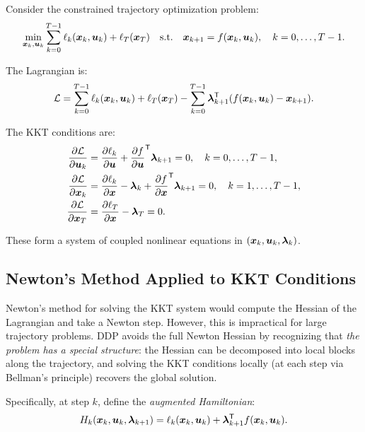 Consider the constrained trajectory optimization problem:
\begin{equation}
\min_{\bm{x}_k, \bm{u}_k} \sum_{k=0}^{T-1} \ell_k(\bm{x}_k,\bm{u}_k) + \ell_T(\bm{x}_T)
\quad \text{s.t.} \quad \bm{x}_{k+1} = f(\bm{x}_k,\bm{u}_k), \quad k = 0, \ldots, T-1.
\label{eq:ch5:traj-opt-full}
\end{equation}

The Lagrangian is:
\begin{equation}
\mathcal{L} = \sum_{k=0}^{T-1} \ell_k(\bm{x}_k,\bm{u}_k) + \ell_T(\bm{x}_T) - \sum_{k=0}^{T-1} \bm{\lambda}_{k+1}^{\mathsf{T}}(f(\bm{x}_k,\bm{u}_k) - \bm{x}_{k+1}).
\label{eq:ch5:lagrangian}
\end{equation}

The KKT conditions are:
\begin{align}
\frac{\partial \mathcal{L}}{\partial \bm{u}_k} &= \frac{\partial \ell_k}{\partial \bm{u}} + \frac{\partial f}{\partial \bm{u}}^{\mathsf{T}}\bm{\lambda}_{k+1} = 0, \quad k = 0, \ldots, T-1, \label{eq:ch5:kkt-u}\\
\frac{\partial \mathcal{L}}{\partial \bm{x}_k} &= \frac{\partial \ell_k}{\partial \bm{x}} - \bm{\lambda}_k + \frac{\partial f}{\partial \bm{x}}^{\mathsf{T}}\bm{\lambda}_{k+1} = 0, \quad k = 1, \ldots, T-1, \label{eq:ch5:kkt-x-mid}\\
\frac{\partial \mathcal{L}}{\partial \bm{x}_T} &= \frac{\partial \ell_T}{\partial \bm{x}} - \bm{\lambda}_T = 0. \label{eq:ch5:kkt-x-term}
\end{align}

These form a system of coupled nonlinear equations in $(\bm{x}_k, \bm{u}_k, \bm{\lambda}_k)$.

\subsection{Newton's Method Applied to KKT Conditions}

Newton's method for solving the KKT system would compute the Hessian of the Lagrangian and take a Newton step.
However, this is impractical for large trajectory problems. DDP avoids the full Newton Hessian by recognizing that
\emph{the problem has a special structure}: the Hessian can be decomposed into local blocks along the trajectory,
and solving the KKT conditions locally (at each step via Bellman's principle) recovers the global solution.

Specifically, at step $k$, define the \emph{augmented Hamiltonian}:
\begin{equation}
H_k(\bm{x}_k,\bm{u}_k,\bm{\lambda}_{k+1}) = \ell_k(\bm{x}_k,\bm{u}_k) + \bm{\lambda}_{k+1}^{\mathsf{T}} f(\bm{x}_k,\bm{u}_k).
\label{eq:ch5:aug-hamiltonian}
\end{equation}

